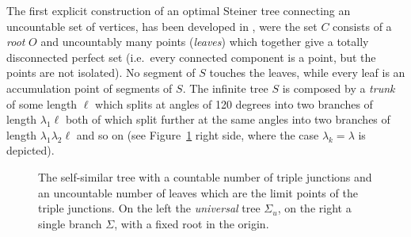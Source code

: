 \documentclass{amsart}
\theoremstyle{definition}
\theoremstyle{remark}
\begin{document}
The first explicit construction of an optimal Steiner tree connecting 
an uncountable set of vertices, has been developed
in \cite{PaoSteTep15}, were the set $C$ consists of a \emph{root} $O$ 
and uncountably many
points (\emph{leaves}) which together give a totally disconnected perfect set 
(i.e.\ every connected component is a point, but the points are not isolated).
No segment of $S$
touches the leaves, while every leaf is an accumulation point of
segments of $S$.
The infinite tree $S$ 
is composed by a \emph{trunk} of
some length $\ell$ which splits at angles of 120 degrees 
into two branches of length $\lambda_1 \ell$ 
both of which split further at the same angles into two branches of length
$\lambda_1\lambda_2\ell$ and so on (see Figure~\ref{fig:tree} right side, where the case 
$\lambda_k=\lambda$ is depicted).
\begin{figure}
  \label{fig:tree}
  \caption{The self-similar tree with a countable 
  number of triple junctions and an uncountable number 
  of leaves which are the limit points of the triple 
  junctions. On the left the \emph{universal} tree $\Sigma_u$, 
  on the right a single branch $\Sigma$, with a fixed root in the origin.}
\end{figure}
\end{document}
